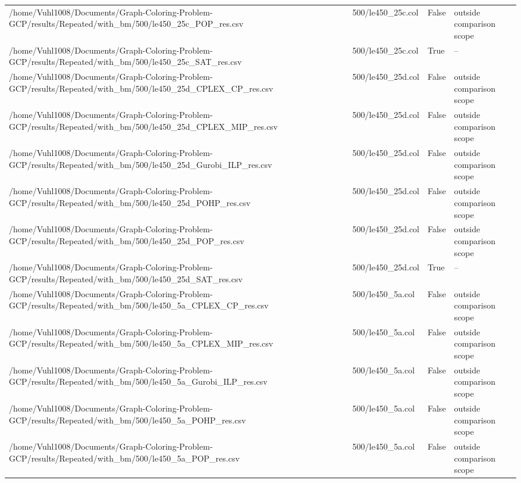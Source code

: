 \begin{table}[htbp]
\begin{tabular}{llll}
/home/Vuhl1008/Documents/Graph-Coloring-Problem-GCP/results/Repeated/with\_bm/500/le450\_25c\_POP\_res.csv & 500/le450\_25c.col & False & outside comparison scope \\
/home/Vuhl1008/Documents/Graph-Coloring-Problem-GCP/results/Repeated/with\_bm/500/le450\_25c\_SAT\_res.csv & 500/le450\_25c.col & True & -- \\
/home/Vuhl1008/Documents/Graph-Coloring-Problem-GCP/results/Repeated/with\_bm/500/le450\_25d\_CPLEX\_CP\_res.csv & 500/le450\_25d.col & False & outside comparison scope \\
/home/Vuhl1008/Documents/Graph-Coloring-Problem-GCP/results/Repeated/with\_bm/500/le450\_25d\_CPLEX\_MIP\_res.csv & 500/le450\_25d.col & False & outside comparison scope \\
/home/Vuhl1008/Documents/Graph-Coloring-Problem-GCP/results/Repeated/with\_bm/500/le450\_25d\_Gurobi\_ILP\_res.csv & 500/le450\_25d.col & False & outside comparison scope \\
/home/Vuhl1008/Documents/Graph-Coloring-Problem-GCP/results/Repeated/with\_bm/500/le450\_25d\_POHP\_res.csv & 500/le450\_25d.col & False & outside comparison scope \\
/home/Vuhl1008/Documents/Graph-Coloring-Problem-GCP/results/Repeated/with\_bm/500/le450\_25d\_POP\_res.csv & 500/le450\_25d.col & False & outside comparison scope \\
/home/Vuhl1008/Documents/Graph-Coloring-Problem-GCP/results/Repeated/with\_bm/500/le450\_25d\_SAT\_res.csv & 500/le450\_25d.col & True & -- \\
/home/Vuhl1008/Documents/Graph-Coloring-Problem-GCP/results/Repeated/with\_bm/500/le450\_5a\_CPLEX\_CP\_res.csv & 500/le450\_5a.col & False & outside comparison scope \\
/home/Vuhl1008/Documents/Graph-Coloring-Problem-GCP/results/Repeated/with\_bm/500/le450\_5a\_CPLEX\_MIP\_res.csv & 500/le450\_5a.col & False & outside comparison scope \\
/home/Vuhl1008/Documents/Graph-Coloring-Problem-GCP/results/Repeated/with\_bm/500/le450\_5a\_Gurobi\_ILP\_res.csv & 500/le450\_5a.col & False & outside comparison scope \\
/home/Vuhl1008/Documents/Graph-Coloring-Problem-GCP/results/Repeated/with\_bm/500/le450\_5a\_POHP\_res.csv & 500/le450\_5a.col & False & outside comparison scope \\
/home/Vuhl1008/Documents/Graph-Coloring-Problem-GCP/results/Repeated/with\_bm/500/le450\_5a\_POP\_res.csv & 500/le450\_5a.col & False & outside comparison scope \\

\end{tabular}
\end{table}
